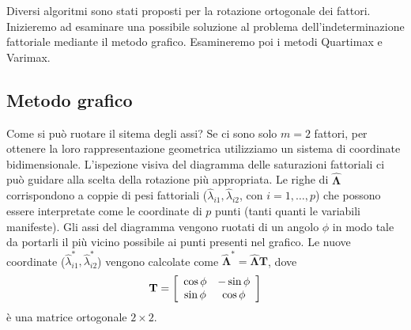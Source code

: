 Diversi algoritmi sono stati proposti per la rotazione ortogonale dei fattori.  Inizieremo ad esaminare una possibile soluzione al problema dell'indeterminazione fattoriale mediante il metodo grafico. Esamineremo poi i metodi Quartimax e Varimax.

\subsection{Metodo grafico}

Come si può ruotare il sitema degli assi? Se ci sono solo $m=2$ fattori, per ottenere la loro rappresentazione geometrica utilizziamo un sistema di coordinate bidimensionale. L'ispezione visiva del diagramma delle saturazioni fattoriali ci può guidare alla scelta della rotazione più appropriata. Le righe di $\hat{\boldsymbol{\Lambda}}$ corrispondono a coppie di pesi fattoriali ($\hat{\lambda}_{i1}, \hat{\lambda}_{i2}$, con $i=1, \dots, p$) che possono essere interpretate come le coordinate di $p$ punti (tanti quanti le variabili manifeste). Gli assi del diagramma vengono ruotati di un angolo $\phi$ in modo tale da portarli il più vicino possibile ai punti presenti nel grafico. Le nuove coordinate ($\hat{\lambda}_{i1}^*, \hat{\lambda}_{i2}^*$) vengono calcolate come $\hat{\boldsymbol{\Lambda}}^* = \hat{\boldsymbol{\Lambda}} \textbf{T}$, dove
\begin{equation}
\textbf{T} = 
\left[
  \begin{array}{ c c }
  \cos{\phi} & - \sin{\phi}\\
  \sin{\phi} & \cos{\phi}
  \end{array} 
\right] \notag
\end{equation}
è una matrice ortogonale $2 \times 2$.

\bigskip

